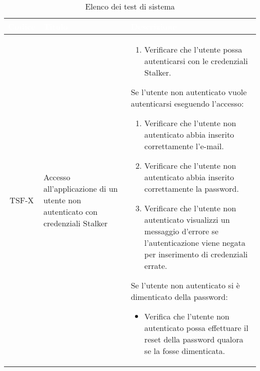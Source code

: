 {
\renewcommand{\arraystretch}{1.5}
\centering
\begin{longtable}{ c | C{3cm} | C{11cm} }
\caption{Elenco dei test di sistema}\\
\textcolor{white}{\textbf{Codice}} & \textcolor{white}{\textbf{Titolo}} & \textcolor{white}{\textbf{Descrizione}} \\
\hline
\endhead


TSF-X & Accesso all'applicazione di un utente non autenticato con credenziali Stalker & \begin{enumerate}
    \item Verificare che l'utente possa autenticarsi con le credenziali Stalker.
\end{enumerate}
Se l'utente non autenticato vuole autenticarsi eseguendo l'accesso:
\begin{enumerate}
    \item Verificare che l'utente non autenticato abbia inserito correttamente l'e-mail.
    \item Verificare che l'utente non autenticato abbia inserito correttamente la password.
    \item Verificare che l'utente non autenticato visualizzi un messaggio d'errore se l'autenticazione viene negata per inserimento di credenziali errate.
\end{enumerate}
Se l'utente non autenticato si è dimenticato della password:
\begin{itemize}
    \item Verifica che l'utente non autenticato possa effettuare il reset della password qualora se la fosse dimenticata.
\end{itemize} \\


\end{longtable}}
